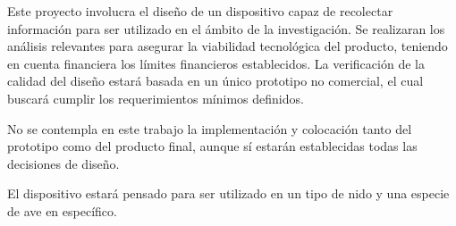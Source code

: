 
Este proyecto involucra el diseño de un dispositivo capaz de recolectar información para ser utilizado en el ámbito de la investigación. Se realizaran los análisis relevantes para asegurar la viabilidad tecnológica del producto, teniendo en cuenta financiera los límites financieros establecidos. La verificación de la calidad del diseño estará basada en un único prototipo no comercial, el cual buscará cumplir los requerimientos mínimos definidos. 

No se contempla en este trabajo la implementación y colocación tanto del prototipo como del producto final, aunque sí estarán establecidas todas las decisiones de diseño. 

El dispositivo estará pensado para ser utilizado en un tipo de nido y una especie de ave en específico.